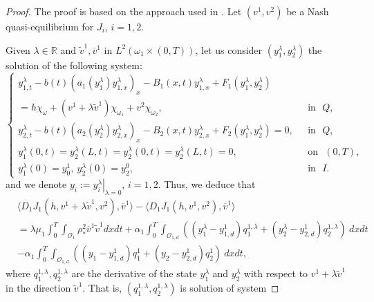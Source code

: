 \documentclass[11pt,a4paper]{amsart}
\numberwithin{equation}{section}
\begin{document}
\begin{proof}
  The proof is based on the approach used in \cite[Proposition 1.4,]{Ara-EFC-San2015}. Let $(v^1,v^2)$ be a Nash quasi-equilibrium for $J_i$, $i=1,2$. 

   Given $\lambda\in \mathbb{R}$ and $\widetilde{v}^1, \overline{v}^1$ in $L^2(\omega_1\times (0,T))$, let us consider $(y_1^\lambda, y_2^\lambda)$  the solution of the following system:
\begin{equation}\label{ylambda}
        \begin{cases}
    		y^\lambda_{1,t}-b(t)\left(a_1(y^\lambda_{1})y^\lambda_{1,x}\right)_x-B_1(x,t) y^\lambda_{1,x}+F_1(y^\lambda_1,y^\lambda_2) \\
            ={h}\chi_{\omega}+(v^1+\lambda\widetilde{v}^1)\chi_{\omega_1}+{v}^2\chi_{\omega_2}, & \ \ \ \text{in} \ \ \ {Q},\\
    		y^\lambda_{2,t}-b(t)\left(a_2(y^\lambda_{2})y^\lambda_{2,x}\right)_x-B_2(x,t) y^\lambda_{2,x}+F_2(y^\lambda_1,y^\lambda_2)=0,& \ \ \ \text{in} \ \ \ {Q},\\
    	   y^\lambda_1(0,t)=y^\lambda_2(L,t)=y^\lambda_2(0,t)=y^\lambda_2(L,t)=0, & \ \ \ \text{on} \ \ \ (0,T),\\
    		y^\lambda_1(0)=y_0^1, \ y^\lambda_2(0)=y_2^0, & \ \ \ \text{in} \ \ \ I.
    	\end{cases}
    \end{equation} and we denote $y_i:=\left. y_i^\lambda\right|_{\lambda=0}$, $i=1, 2$.  Thus, we deduce that
    \begin{equation}\label{ecD2defi}
        \begin{split}
            & \langle D_1 J_1(h,v^1+\lambda\widetilde{v}^1,v^2 ),\overline{v}^1 \rangle-  \langle D_1 J_1(h,v^1,v^2 ),\overline{v}^1 \rangle\\
            &= \lambda \mu_1 \int_{0}^{T}\int_{\mathcal{O}_{1}} \rho_*^2 \overline{v}^1\widetilde{v}^1dxdt
    		+\alpha_1\int_{0}^{T}\int_{\mathcal{O}_{1,d}}\left( (y_1^\lambda-y^1_{1,d})q^{1,\lambda}_1+(y_2^\lambda-y^1_{2,d})q^{1,\lambda}_2 \right)\ dx dt \\
    		&-\alpha_1\int_{0}^{T}\int_{\mathcal{O}_{1,d}}\left( (y_1-y^1_{1,d})q^{1}_1+(y_2-y^1_{2,d})q^{1}_2 \right)\ dx dt,
        \end{split}
    \end{equation}where $q^{1,\lambda}_1, q^{1,\lambda}_2$ are the derivative of the state $y^\lambda_1$ and $y^\lambda_2$ with respect to $v^1+\lambda\widetilde{v}^1$ in the direction $\widetilde{v}^1$. That is, $(q^{1,\lambda}_1, q^{1,\lambda}_2)$ is solution of system   


\end{proof}
\end{document}
